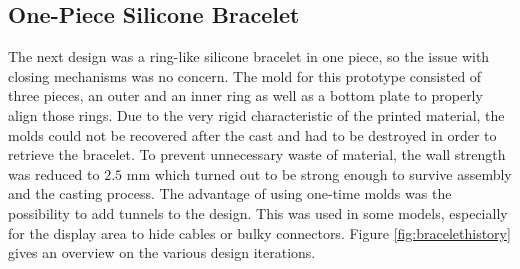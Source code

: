 \subsection{One-Piece Silicone Bracelet}
\label{sec:silicone-prototypes}
The next design was a ring-like silicone bracelet in one piece, so the issue with closing mechanisms was no concern. The mold for this prototype consisted of three pieces, an outer and an inner ring as well as a bottom plate to properly align those rings. Due to the very rigid characteristic of the printed material, the molds could not be recovered after the cast and had to be destroyed in order to retrieve the bracelet. To prevent unnecessary waste of material, the wall strength was reduced to $2.5$ mm which turned out to be strong enough to survive assembly and the casting process. The advantage of using one-time molds was the possibility to add tunnels to the design. This was used in some models, especially for the display area to hide cables or bulky connectors. Figure \ref{fig:bracelethistory} gives an overview on the various design iterations.

